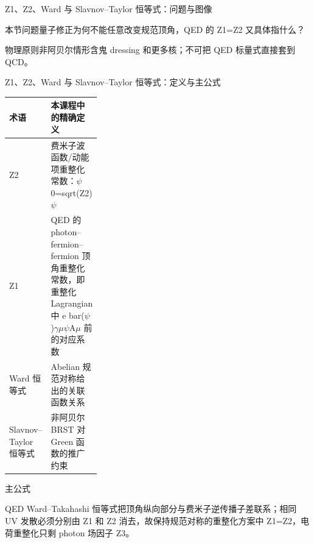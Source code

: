 \begin{frame}[t]{Z1、Z2、Ward 与 Slavnov--Taylor 恒等式：问题与图像}
\footnotesize
\begin{block}{本节问题}量子修正为何不能任意改变规范顶角，QED 的 Z1=Z2 又具体指什么？\end{block}
\begin{block}{物理原则}\quad 非阿贝尔情形含鬼 dressing 和更多核；不可把 QED 标量式直接套到 QCD。\end{block}
\end{frame}

\begin{frame}[t]{Z1、Z2、Ward 与 Slavnov--Taylor 恒等式：定义与主公式}
\footnotesize\begin{tabularx}{\linewidth}{p{0.30\linewidth}Y}
\toprule 术语 & 本课程中的精确定义\\\midrule
{} Z2 & 费米子波函数/\allowbreak{}动能项重整化常数：\ensuremath{\psi}0=sqrt(Z2)\ensuremath{\psi}\\
 Z1 & QED 的 photon--fermion--fermion 顶角重整化常数，即重整化 Lagrangian 中 e bar(\ensuremath{\psi})\ensuremath{\gamma}\ensuremath{\mu}\ensuremath{\psi}A\ensuremath{\mu} 前的对应系数\\
 Ward 恒等式 & Abelian 规范对称给出的关联函数关系\\
 Slavnov--Taylor 恒等式 & 非阿贝尔 BRST 对 Green 函数的推广约束\\
\bottomrule\end{tabularx}\vspace{0.15cm}
\begin{block}{ 主公式}\centering{}\end{block}
QED Ward--Takahashi 恒等式把顶角纵向部分与费米子逆传播子差联系；相同 UV 发散必须分别由 Z1 和 Z2 消去，故保持规范对称的重整化方案中 Z1=Z2，电荷重整化只剩 photon 场因子 Z3。
\end{frame}

